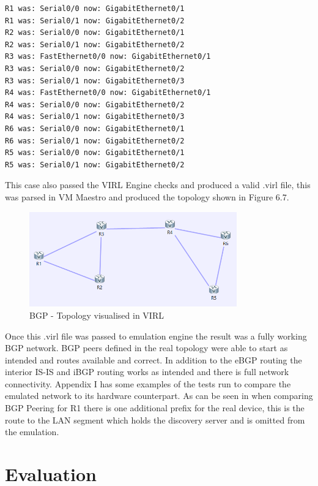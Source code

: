 \documentclass[11pt]{report}
\begin{document}
\begin{lstlisting}[caption=Interface mappings for BGP topology]
R1 was: Serial0/0 now: GigabitEthernet0/1
R1 was: Serial0/1 now: GigabitEthernet0/2
R2 was: Serial0/0 now: GigabitEthernet0/1
R2 was: Serial0/1 now: GigabitEthernet0/2
R3 was: FastEthernet0/0 now: GigabitEthernet0/1
R3 was: Serial0/0 now: GigabitEthernet0/2
R3 was: Serial0/1 now: GigabitEthernet0/3
R4 was: FastEthernet0/0 now: GigabitEthernet0/1
R4 was: Serial0/0 now: GigabitEthernet0/2
R4 was: Serial0/1 now: GigabitEthernet0/3
R6 was: Serial0/0 now: GigabitEthernet0/1
R6 was: Serial0/1 now: GigabitEthernet0/2
R5 was: Serial0/0 now: GigabitEthernet0/1
R5 was: Serial0/1 now: GigabitEthernet0/2
\end{lstlisting}

This case also passed the VIRL Engine checks and produced a valid .virl file, this was parsed in VM Maestro and produced the topology shown in Figure 6.7.

\FloatBarrier
\begin{figure}[h!]
	\caption{BGP - Topology visualised in VIRL}
	\centering
	\begin{center}
		\includegraphics[width=0.8\textwidth]{BGP-VIRL.png}
	\end{center}
\end{figure}
\FloatBarrier

Once this .virl file was passed to emulation engine the result was a fully working BGP network. BGP peers defined in the real topology were able to start as intended and routes available and correct. In addition to the eBGP routing the interior IS-IS and iBGP routing works as intended and there is full network connectivity. Appendix I has some examples of the tests run to compare the emulated network to its hardware counterpart. As can be seen in when comparing BGP Peering for R1 there is one additional prefix for the real device, this is the route to the LAN segment which holds the discovery server and is omitted from the emulation.

\chapter{Evaluation}
\end{document}
